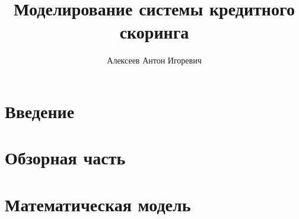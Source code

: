 \documentclass[14pt,a4paper]{book}
\author{Алексеев Антон Игоревич}
\title{Моделирование системы кредитного скоринга}
\begin{document}
\section{Введение}
\section{Обзорная часть}
\section{Математическая модель}
\end{document}
